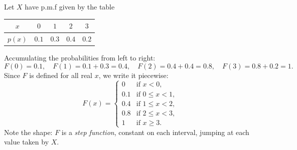 \documentclass[11pt]{article}
\begin{document}
\begin{exemplebox}
Let $X$ have p.m.f given by the table
\begin{center}
\begin{tabular}{|c|cccc|}
\hline
\rowcolor{popblueL} $x$ & $0$ & $1$ & $2$ & $3$ \\
\hline
$p(x)$ & $0.1$ & $0.3$ & $0.4$ & $0.2$ \\
\hline
\end{tabular}
\end{center}
Accumulating the probabilities from left to right:
\[ F(0) = 0.1, \quad F(1) = 0.1 + 0.3 = 0.4, \quad F(2) = 0.4 + 0.4 = 0.8, \quad F(3) = 0.8 + 0.2 = 1. \]
Since $F$ is defined for all real $x$, we write it piecewise:
\[ F(x) = \begin{cases} 0 & \text{if } x < 0, \\ 0.1 & \text{if } 0 \le x < 1, \\ 0.4 & \text{if } 1 \le x < 2, \\ 0.8 & \text{if } 2 \le x < 3, \\ 1 & \text{if } x \ge 3. \end{cases} \]
Note the shape: $F$ is a \emph{step function}, constant on each interval, jumping at each value taken by $X$.
\end{exemplebox}
\end{document}

